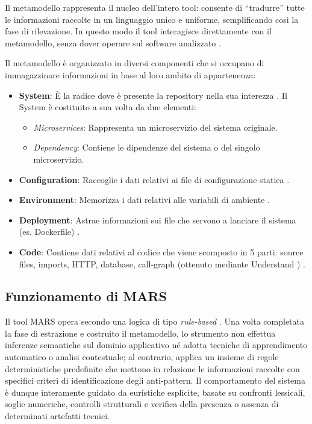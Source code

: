 Il metamodello rappresenta il nucleo dell’intero tool: consente di “tradurre” tutte le informazioni raccolte in un linguaggio unico e uniforme, semplificando così la fase di rilevazione. In questo modo il tool interagisce direttamente con il metamodello, senza dover operare sul software analizzato \cite{MARS}.

Il metamodello è organizzato in diversi componenti che si occupano di immagazzinare informazioni in base al loro ambito di appartenenza:
\begin{itemize}
    \item \textbf{System}: È la radice dove è presente la repository nella sua interezza \cite{MARS}.
    Il System è costituito a sua volta da due elementi:
        \begin{itemize}
            \item \textit{Microservices}: Rappresenta un microservizio del sistema originale.
            \item \textit{Dependency}: Contiene le dipendenze del sistema o del singolo microservizio.
        \end{itemize}
    \item \textbf{Configuration}: Raccoglie i dati relativi ai file di configurazione statica \cite{MARS}.
    \item \textbf{Environment}: Memorizza i dati relativi alle variabili di ambiente \cite{MARS}.
    \item \textbf{Deployment}: Astrae informazioni sui file che servono a lanciare il sistema (es. Dockerfile) \cite{MARS}.
    \item \textbf{Code}: Contiene dati relativi al codice che viene scomposto in 5 parti: source files, imports, HTTP, database, call-graph (ottenuto mediante Understand \cite{scitools_understand}) \cite{MARS}.
\end{itemize}

\subsection{Funzionamento di MARS}

Il tool MARS opera secondo una logica di tipo
\textit{rule-based} \cite{MARS}. Una volta completata la fase di estrazione e costruito il metamodello, lo strumento non effettua inferenze semantiche sul dominio
applicativo né adotta tecniche di apprendimento automatico o analisi contestuale;
al contrario, applica un insieme di regole deterministiche predefinite che
mettono in relazione le informazioni raccolte con specifici criteri di
identificazione degli anti-pattern. Il comportamento del sistema è dunque
interamente guidato da euristiche esplicite, basate su confronti lessicali,
soglie numeriche, controlli strutturali e verifica della presenza o assenza
di determinati artefatti tecnici.

